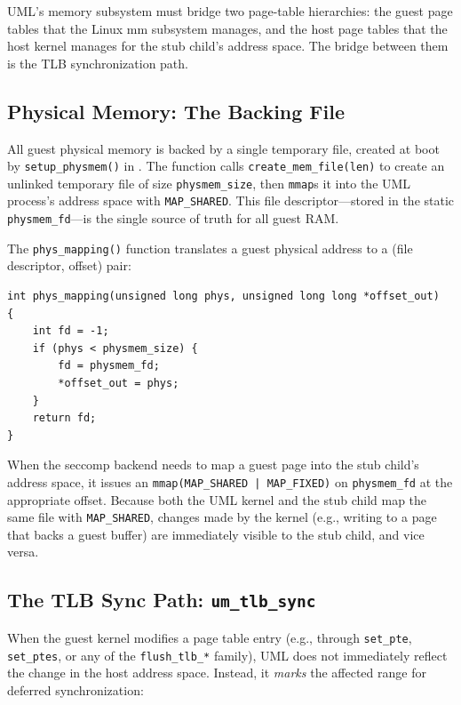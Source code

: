UML's memory subsystem must bridge two page-table hierarchies: the guest page
tables that the Linux mm subsystem manages, and the host page tables that the
host kernel manages for the stub child's address space.  The bridge between
them is the TLB synchronization path.

\subsection{Physical Memory: The Backing File}
\label{sec:impl-physmem}

All guest physical memory is backed by a single temporary file, created
at boot by \texttt{setup\_physmem()} in .
The function calls \texttt{create\_mem\_file(len)} to create an unlinked
temporary file of size \texttt{physmem\_size}, then \texttt{mmap}s it into
the UML process's address space with \texttt{MAP\_SHARED}.  This file
descriptor---stored in the static \texttt{physmem\_fd}---is the single source
of truth for all guest RAM.

The \texttt{phys\_mapping()} function translates a guest physical address to
a (file descriptor, offset) pair:

\begin{lstlisting}[language=KernelC,caption={Physical address to file mapping},label=lst:phys-mapping]
int phys_mapping(unsigned long phys, unsigned long long *offset_out)
{
    int fd = -1;
    if (phys < physmem_size) {
        fd = physmem_fd;
        *offset_out = phys;
    }
    return fd;
}
\end{lstlisting}

When the seccomp backend needs to map a guest page into the stub child's
address space, it issues an \texttt{mmap(MAP\_SHARED | MAP\_FIXED)} on
\texttt{physmem\_fd} at the appropriate offset.  Because both the UML kernel
and the stub child map the same file with \texttt{MAP\_SHARED}, changes made
by the kernel (e.g., writing to a page that backs a guest buffer) are
immediately visible to the stub child, and vice versa.

\subsection{The TLB Sync Path: \texttt{um\_tlb\_sync}}
\label{sec:impl-tlb-sync}

When the guest kernel modifies a page table entry (e.g., through
\texttt{set\_pte}, \texttt{set\_ptes}, or any of the \texttt{flush\_tlb\_*}
family), UML does not immediately reflect the change in the host address space.
Instead, it \emph{marks} the affected range for deferred synchronization:

